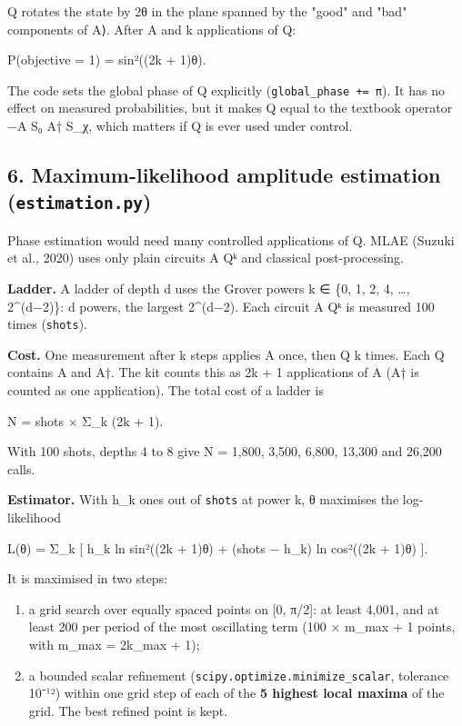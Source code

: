 \documentclass[
  10pt,
]{article}
\providecommand{\tightlist}{%
  \setlength{\itemsep}{0pt}\setlength{\parskip}{0pt}}
\begin{document}
Q rotates the state by 2θ in the plane spanned by the "good" and "bad"
components of A⟩. After A and k applications of Q:

P(objective = 1) = sin²((2k + 1)θ).

The code sets the global phase of Q explicitly
(\texttt{global\_phase\ +=\ π}). It has no effect on measured
probabilities, but it makes Q equal to the textbook operator −A S₀ A†
S\_χ, which matters if Q is ever used under control.

\hypertarget{6-maximum-likelihood-amplitude-estimation-estimationpy}{%
\subsection{\texorpdfstring{6. Maximum-likelihood amplitude estimation
(\texttt{estimation.py})}{6. Maximum-likelihood amplitude estimation (estimation.py)}}\label{6-maximum-likelihood-amplitude-estimation-estimationpy}}

Phase estimation would need many controlled applications of Q. MLAE
(Suzuki et al., 2020) uses only plain circuits A Qᵏ and classical
post-processing.

\textbf{Ladder.} A ladder of depth d uses the Grover powers k ∈ \{0, 1,
2, 4, \ldots, 2\^{}(d−2)\}: d powers, the largest 2\^{}(d−2). Each
circuit A Qᵏ is measured 100 times (\texttt{shots}).

\textbf{Cost.} One measurement after k steps applies A once, then Q k
times. Each Q contains A and A†. The kit counts this as 2k + 1
applications of A (A† is counted as one application). The total cost of
a ladder is

N = shots × Σ\_k (2k + 1).

With 100 shots, depths 4 to 8 give N = 1,800, 3,500, 6,800, 13,300 and
26,200 calls.

\textbf{Estimator.} With h\_k ones out of \texttt{shots} at power k, θ
maximises the log-likelihood

L(θ) = Σ\_k {[} h\_k ln sin²((2k + 1)θ) + (shots − h\_k) ln cos²((2k +
1)θ) {]}.

It is maximised in two steps:

\begin{enumerate}
\def\labelenumi{\arabic{enumi}.}
\tightlist
\item
  a grid search over equally spaced points on {[}0, π/2{]}: at least
  4,001, and at least 200 per period of the most oscillating term (100 ×
  m\_max + 1 points, with m\_max = 2k\_max + 1);
\item
  a bounded scalar refinement (\texttt{scipy.optimize.minimize\_scalar},
  tolerance 10⁻¹²) within one grid step of each of the \textbf{5 highest
  local maxima} of the grid. The best refined point is kept.
\end{enumerate}
\end{document}
